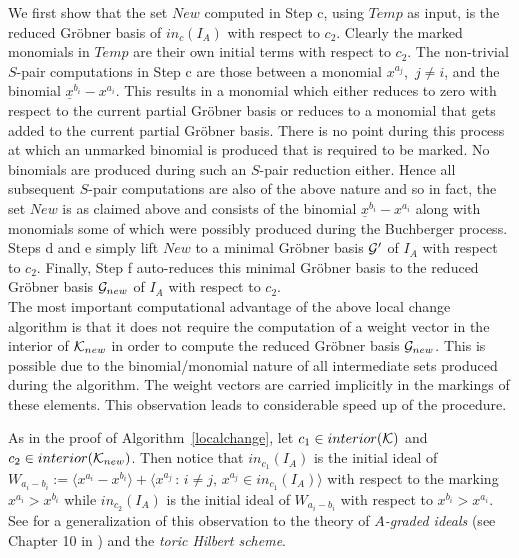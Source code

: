\documentclass[11pt]{article}
\begin{document}
We first show that the set $New$ computed in Step c, using $Temp$ as
input, is the reduced Gr\"obner basis of $in_c(I_A)$ with respect to
$c_2$. Clearly the marked monomials in $Temp$ are 
their own initial terms with respect to $c_2$. The non-trivial $S$-pair
computations in Step c are those between a monomial $x^{a_j}$,\, $j
\neq i$, and the
binomial ${\underline x^{b_i}}-x^{a_i}$. This results in a monomial
which either reduces to zero with respect to the current partial 
Gr\"obner basis or reduces to a monomial that gets added to the 
current partial Gr\"obner basis. There is no point during this process
at which an unmarked  binomial is produced that is required to be marked.
No binomials are produced during such an $S$-pair 
reduction either. Hence all subsequent $S$-pair computations are 
also of the above nature and so in fact, the set $New$ is as 
claimed above and consists of the binomial ${\underline
x^{b_i}}-x^{a_i}$ along with monomials some of which were possibly
produced during the Buchberger process. Steps d and e simply lift
$New$ to a minimal Gr\"obner basis ${\cal G'}$ of $I_A$ with respect
to $c_2$. Finally, Step f auto-reduces this minimal Gr\"obner basis
to the reduced Gr\"obner basis ${\cal G}_{new}$ of $I_A$ with
respect to $c_2$. \\

The most important computational advantage of the above local change
algorithm is that it does not require the computation of a weight
vector in the interior of ${\cal K}_{new}$ in order to compute the
reduced Gr\"obner basis ${\cal G}_{new}$. This is possible due to the
binomial/monomial nature of all intermediate sets produced during the
algorithm. The weight vectors are carried implicitly in the markings
of these elements. This observation leads to considerable speed up of
the procedure. 

\begin{remark} \label{dianeobservation}
As in the proof of Algorithm~\ref{localchange}, let 
$c_1 \in interior({\cal K})$ and $c_2 \in interior({\cal K}_{new})$.
Then notice that $in_{c_1}(I_A)$ is the initial ideal 
of $W_{a_i - b_i} := \langle x^{a_i} - x^{b_i} \rangle + \langle
x^{a_j} \, : \, i \neq j, \, x^{a_j} \in in_{c_1}(I_A) \rangle$ with
respect to the marking $x^{a_i} > x^{b_i}$ while $in_{c_2}(I_A)$ is
the initial ideal of $W_{a_i - b_i}$ with respect to $x^{b_i} >
x^{a_i}$. See \cite{MT} for a generalization of this observation to 
the theory of {\em $A$-graded ideals} (see Chapter 10 in \cite{Stu})
and the {\em toric Hilbert scheme}. 
\end{remark}
\end{document}
